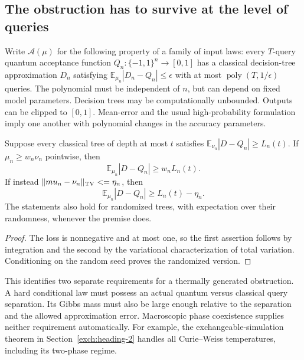 \subsection{The obstruction has to survive at the level of queries}
\label{threshold:obstruction-transfer}

Write $\mathcal A(\mu)$ for the following property of a family of input
laws: every $T$-query quantum acceptance function $Q_n:\{-1,1\}^n\to[0,1]$
has a classical decision-tree approximation $D_n$ satisfying
$\mathbb E_{\mu_n}|D_n-Q_n|\le\epsilon$ with at most
$\operatorname{poly}(T,1/\epsilon)$ queries.  The polynomial must be
independent of $n$, but can depend on fixed model parameters.  Decision
trees may be computationally unbounded.  Outputs can be clipped to
$[0,1]$.  Mean-error and the usual high-probability formulation imply
one another with polynomial changes in the accuracy parameters.

\begin{lemma}
\label{threshold:hard-component}
Suppose every classical tree of depth at most $t$ satisfies
$\mathbb E_{\nu_n}|D-Q_n|\ge L_n(t)$.  If
$\mu_n\ge w_n\nu_n$ pointwise, then
\[
 \mathbb E_{\mu_n}|D-Q_n|\ge w_nL_n(t).
\]
If instead $\|\mu_n-\nu_n\|_{\rm TV}\le\eta_n$, then
\[
 \mathbb E_{\mu_n}|D-Q_n|\ge L_n(t)-\eta_n.
\]
The statements also hold for randomized trees, with expectation over
their randomness, whenever the premise does.
\end{lemma}

\begin{proof}
The loss is nonnegative and at most one, so the first assertion follows
by integration and the second by the variational characterization of
total variation.  Conditioning on the random seed proves the randomized
version.
\end{proof}

This identifies two separate requirements for a thermally generated
obstruction.  A hard conditional law must possess an actual quantum
versus classical query separation.  Its Gibbs mass must also be large
enough relative to the separation and the allowed approximation error.
Macroscopic phase coexistence supplies neither requirement automatically.
For example, the exchangeable-simulation theorem in
Section~\ref{exch:heading-2} handles all Curie--Weiss temperatures,
including its two-phase regime.
